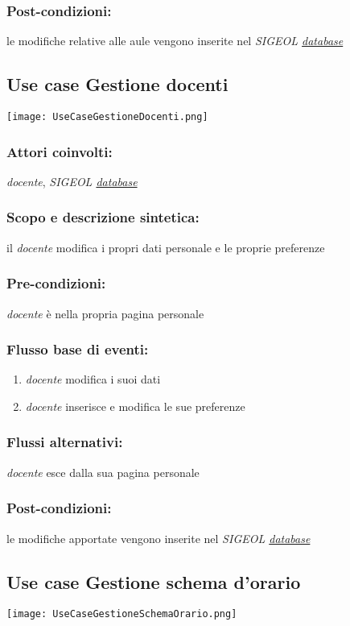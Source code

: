 \documentclass[11pt,a4paper]{article}
\begin{document}
\subsubsection*{Post-condizioni:}
le modifiche relative alle aule vengono inserite nel \textit{SIGEOL \underline{database}}
\subsection{Use case Gestione docenti}
\begin{center} 
 \texttt{[image: UseCaseGestioneDocenti.png]}
\end{center}
\subsubsection*{Attori coinvolti:}
\textit{docente}, \textit{SIGEOL \underline{database}}
\subsubsection*{Scopo e descrizione sintetica:}
il \textit{docente} modifica i propri dati personale e le proprie preferenze
\subsubsection*{Pre-condizioni:}
\textit{docente} è nella propria pagina personale
\subsubsection*{Flusso base di eventi:}
\begin{enumerate}
 \item \textit{docente} modifica i suoi dati 
 \item \textit{docente} inserisce e modifica le sue preferenze
\end{enumerate}
\subsubsection*{Flussi alternativi:}
\textit{docente} esce dalla sua pagina personale
\subsubsection*{Post-condizioni:}
le modifiche apportate vengono inserite nel \textit{SIGEOL \underline{database}}
\subsection{Use case Gestione schema d'orario}
\begin{center} 
 \texttt{[image: UseCaseGestioneSchemaOrario.png]}
\end{center}
\end{document}
